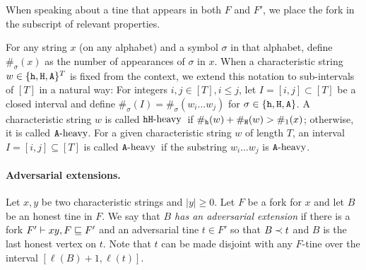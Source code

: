   \noindent
  When speaking about a tine that appears in both $F$ and $F'$, 
  we place the fork in the subscript of relevant properties.


    For any string $x$ (on any alphabet) and a symbol $\sigma$ in that alphabet, 
    define $\#_\sigma(x)$ 
    as the number of appearances of $\sigma$ in $x$. 
    When a characteristic string $w \in \{\mathtt{h}, \mathtt{H}, \mathtt{A}\}^T$ is fixed from the context, 
    we extend this notation to sub-intervals of $[T]$ in a natural way: 
    For integers $i, j \in [T], i \leq j$, 
    let $I = [i, j] \subset [T]$ be a closed interval 
    and define $\#_\sigma(I) = \#_\sigma(w_i \ldots w_j)$ for $\sigma \in \{\mathtt{h}, \mathtt{H}, \mathtt{A}\}$. 
    A characteristic string $w$ is called $\mathtt{h}\mathtt{H}\text{-heavy}$\ if $\#_{\mathtt{h}}(w) + \#_{\mathtt{H}}(w) > \#_1(x)$; 
    otherwise, it is called $\mathtt{A}\text{-heavy}$. 
    For a given characteristic string $w$ of length $T$, 
    an interval $I = [i,j] \subseteq [T]$ is called $\mathtt{A}\text{-heavy}$\ 
    if the substring $w_i \ldots w_j$ is $\mathtt{A}\text{-heavy}$.


    \paragraph{Adversarial extensions.} 
    Let $x,y$ be two characteristic strings and $|y| \geq 0$.
    Let $F$ be a fork for $x$ and let $B$ be an honest tine in $F$. 
    We say that \emph{$B$ has an adversarial extension} 
    if there is a fork $F' \vdash xy, F \sqsubseteq F'$ and 
    an adversarial tine $t \in F'$ 
    so that $B \prec t$ and  
    $B$ is the last honest vertex on $t$. 
    Note that $t$ can be made disjoint with any $F$-tine 
    over the interval $[\ell(B) + 1, \ell(t)]$. 
    

    


